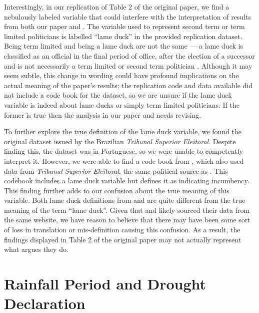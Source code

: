 \documentclass[12pt]{article}
\begin{document}
Interestingly, in our replication of Table 2 of the original paper, we
find a nebulously labeled variable that could interfere with the
interpretation of results from both our paper and
\citet{cooperman2021natural}. The variable \citet{cooperman2021natural}
used to represent second term or term limited politicians is labelled
``lame duck'' in the provided replication dataset. Being term limited
and being a lame duck are not the same --- a lame duck is classified as
an official in the final period of office, after the election of a
successor and is not necessarily a term limited or second term
politician \citep{jenkins2008partisanship}. Although it may seem subtle,
this change in wording could have profound implications on the actual
meaning of the paper's results; the replication code and data available
did not include a code book for the dataset, so we are unsure if the
lame duck variable is indeed about lame ducks or simply term limited
politicians. If the former is true then the analysis in our paper and
\citet{cooperman2021natural} needs revising.

To further explore the true definition of the lame duck variable, we
found the original dataset issued by the Brazilian \emph{Tribunal
Superior Eleitoral}. Despite finding this, the dataset was in
Portuguese, so we were unable to competently interpret it. However, we
were able to find a code book from \citet{hollyer2021parties}, which
also used data from \emph{Tribunal Superior Eleitoral}, the same
political source as \citet{cooperman2021natural}. This codebook includes
a lame duck variable but defines it as indicating incumbency. This
finding further adds to our confusion about the true meaning of this
variable. Both lame duck definitions from \citet{cooperman2021natural}
and \citet{hollyer2021parties} are quite different from the true meaning
of the term ``lame duck''. Given that \citet{hollyer2021parties} and
\citet{cooperman2021natural} likely sourced their data from the same
website, we have reason to believe that there may have been some sort of
loss in translation or mis-definition causing this confusion. As a
result, the findings displayed in Table 2 of the original paper may not
actually represent what \citet{cooperman2021natural} argues they do.

\section{Rainfall Period and Drought Declaration}
\label{sec:rain_period}
\end{document}
